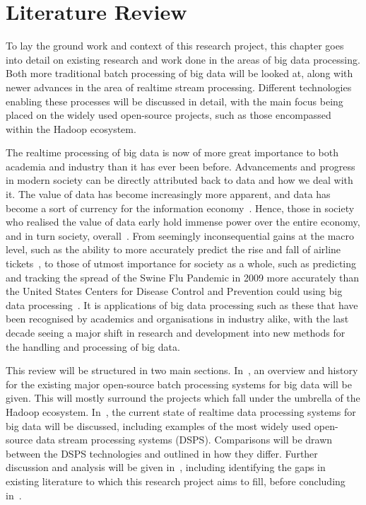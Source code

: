 \section{Literature Review}
\label{sec:litrev}

To lay the ground work and context of this research project, this chapter goes into detail on existing
research and work done in the areas of big data processing. Both more traditional batch processing of big
data will be looked at, along with newer advances in the area of realtime stream processing. Different
technologies enabling these processes will be discussed in detail, with the main focus being placed on the
widely used open-source projects, such as those encompassed within the Hadoop ecosystem.

The realtime processing of big data is now of more great importance to both academia and industry than it has
ever been before. Advancements and progress in modern society can be directly attributed back to data and
how we deal with it. The value of data has become increasingly more apparent, and data has become a sort of
currency for the information economy~\cite{st2009examining}. Hence, those in society who realised the value of
data early hold immense power over the entire economy, and in turn society,
overall~\cite{lievesley1993increasing}. From seemingly inconsequential gains at the macro level, such as the
ability to more accurately predict the rise and fall of airline tickets~\cite{darlin2006airfares}, to those
of utmost importance for society as a whole, such as predicting and tracking the spread of the Swine Flu
Pandemic in 2009 more accurately than the United States Centers for Disease Control and Prevention
could using big data processing~\cite{ritterman2009using,mayer2013big}. It is applications of big data
processing such as these that have been recognised by academics and organisations in industry alike, with the
last decade seeing a major shift in research and development into new methods for the handling
and processing of big data.

This review will be structured in two main sections.
In~, an overview and history for the existing major open-source batch
processing systems for big data will be given. This will mostly surround the projects which fall under the
umbrella of the Hadoop ecosystem. In~, the current state of realtime
data processing systems for big data will be discussed, including examples of the most widely used open-source
data stream processing systems (DSPS). Comparisons will be drawn between the DSPS technologies and outlined
in how they differ. Further discussion and analysis will be given in~,
including identifying the gaps in existing literature to which this research project aims to fill,
before concluding in~.

